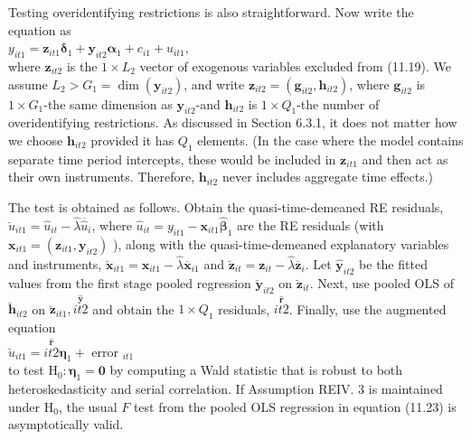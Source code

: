\documentclass[10pt]{article}
\begin{document}
Testing overidentifying restrictions is also straightforward. Now write the equation as\\
$y_{i t 1}=\mathbf{z}_{i t 1} \boldsymbol{\delta}_{1}+\mathbf{y}_{i t 2} \boldsymbol{\alpha}_{1}+c_{i 1}+u_{i t 1}$,\\
where $\mathbf{z}_{i t 2}$ is the $1 \times L_{2}$ vector of exogenous variables excluded from (11.19). We assume $L_{2}>G_{1}=\operatorname{dim}\left(\mathbf{y}_{i t 2}\right)$, and write $\mathbf{z}_{i t 2}=\left(\mathbf{g}_{i t 2}, \mathbf{h}_{i t 2}\right)$, where $\mathbf{g}_{i t 2}$ is $1 \times G_{1}$-the same dimension as $\mathbf{y}_{i t 2}$-and $\mathbf{h}_{i t 2}$ is $1 \times Q_{1}$-the number of overidentifying restrictions. As discussed in Section 6.3.1, it does not matter how we choose $\mathbf{h}_{i t 2}$ provided it has $Q_{1}$ elements. (In the case where the model contains separate time period intercepts, these would be included in $\mathbf{z}_{i t 1}$ and then act as their own instruments. Therefore, $\mathbf{h}_{i t 2}$ never includes aggregate time effects.)

The test is obtained as follows. Obtain the quasi-time-demeaned RE residuals, $\hat{\breve{u}}_{i t 1}=\hat{u}_{i t}-\hat{\lambda} \overline{\hat{u}}_{i}$, where $\hat{u}_{i t}=y_{i t 1}-\mathbf{x}_{i t 1} \hat{\boldsymbol{\beta}}_{1}$ are the RE residuals (with $\mathbf{x}_{i t 1}=\left(\mathbf{z}_{i t 1}, \mathbf{y}_{i t 2}\right)$ ), along with the quasi-time-demeaned explanatory variables and instruments, $\breve{\mathbf{x}}_{i t 1}=\mathbf{x}_{i t 1}-\hat{\lambda} \overline{\mathbf{x}}_{i 1}$ and $\breve{\mathbf{z}}_{i t}=\mathbf{z}_{i t}-\hat{\lambda} \overline{\mathbf{z}}_{i}$. Let $\hat{\mathbf{y}}_{i t 2}$ be the fitted values from the first stage pooled regression $\breve{\mathbf{y}}_{i t 2}$ on $\breve{\mathbf{z}}_{i t}$. Next, use pooled OLS of $\breve{\mathbf{h}}_{i t 2}$ on $\breve{\mathbf{z}}_{i t 1}, \stackrel{\hat{\mathbf{y}}}{i t 2}$ and obtain the $1 \times Q_{1}$ residuals, $\stackrel{\hat{\mathbf{r}}}{i t 2}$. Finally, use the augmented equation\\
$\breve{u}_{i t 1}=\stackrel{\hat{\mathbf{r}}}{i t 2} \boldsymbol{\eta}_{1}+$ error $_{i t 1}$\\
to test $\mathrm{H}_{0}: \boldsymbol{\eta}_{1}=\mathbf{0}$ by computing a Wald statistic that is robust to both heteroskedasticity and serial correlation. If Assumption REIV. 3 is maintained under $\mathrm{H}_{0}$, the usual $F$ test from the pooled OLS regression in equation (11.23) is asymptotically valid.
\end{document}
